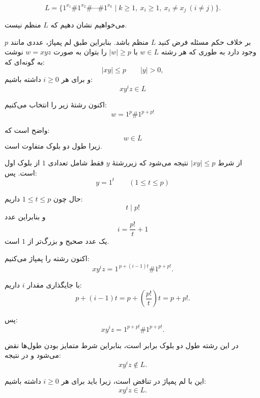 \[
L=\{1^{x_1}\#1^{x_2}\#\cdots\#1^{x_k}
\mid k\ge1,\ x_i\ge1,\ x_i\neq x_j \ (i\neq j)\}.
\]

می‌خواهیم نشان دهیم که $L$ منظم نیست.

بر خلاف حکم مسئله فرض کنید $L$ منظم باشد.  
بنابراین طبق لم پمپاژ، عددی مانند $p$ وجود دارد به طوری که هر رشته
$w\in L$ با $|w|\ge p$
را بتوان به صورت
\(
w=xyz
\)
نوشت به گونه‌ای که:
\[
|xy|\le p
\qquad
|y|>0,
\]
و برای هر $i\ge0$ داشته باشیم:
\[
xy^iz\in L
\]

اکنون رشتهٔ زیر را انتخاب می‌کنیم:
\[
w=1^p\#1^{p+p!}
\]

واضح است که:
\[
w\in L
\]
زیرا طول دو بلوک متفاوت است.

از شرط
\(
|xy|\le p
\)
نتیجه می‌شود که زیررشتهٔ $y$ فقط شامل تعدادی $1$ از بلوک اول است. پس:
\[
y=1^t
\qquad (1\le t\le p)
\]

حال چون
\(
1\le t\le p
\)
داریم:
\[
t \mid p!
\]
و بنابراین عدد
\[
i = \frac{p!}{t}+1
\]
یک عدد صحیح و بزرگ‌تر از $1$ است.

اکنون رشته را پمپاژ می‌کنیم:
\[
xy^iz
=
1^{\,p+(i-1)t}\#1^{p+p!}.
\]

با جایگذاری مقدار $i$ داریم:
\[
p+(i-1)t
=
p+\left(\frac{p!}{t}\right)t
=
p+p!.
\]

پس:
\[
xy^iz
=
1^{p+p!}\#1^{p+p!}.
\]

در این رشته طول دو بلوک برابر است، بنابراین شرط متمایز بودن طول‌ها نقض می‌شود و در نتیجه:
\[
xy^iz\notin L.
\]

این با لم پمپاژ در تناقض است، زیرا باید برای هر $i\ge0$ داشته باشیم:
\[
xy^iz\in L.
\]
